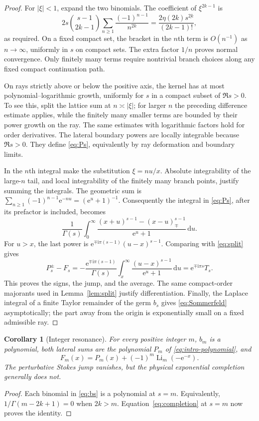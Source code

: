 \documentclass[11pt,a4paper]{article}
\newtheorem{corollary}[theorem]{Corollary}
\theoremstyle{definition}\newtheorem{definition}[theorem]{Definition}
\theoremstyle{remark}\newtheorem{remark}[theorem]{Remark}
\newcommand{\Li}{\operatorname{Li}}
\newcommand{\dd}{\,\mathrm d}
\newcommand{\ii}{\mathrm i}
\newcommand{\ee}{\mathrm e}
\numberwithin{equation}{section}
\begin{document}
\begin{proof}
For $|\xi|<1$, expand the two binomials. The coefficient of $\xi^{2k-1}$
is
\[
 2s\binom{s-1}{2k-1}\sum_{n\ge1}\frac{(-1)^{n-1}}{n^{2k}}
 =\frac{2\eta(2k)s^{\underline{2k}}}{(2k-1)!},
\]
as required. On a fixed compact set, the bracket in the $n$th term is
$O(n^{-1})$ as $n\to\infty$, uniformly in $s$ on compact sets. The extra
factor $1/n$ proves normal convergence. Only finitely many terms require
nontrivial branch choices along any fixed compact continuation path.

On rays strictly above or below the positive axis, the kernel has at most
polynomial--logarithmic growth, uniformly for $s$ in a compact subset of
$\Re s>0$. To see this, split the lattice sum at $n\asymp|\xi|$;
for larger $n$ the preceding difference estimate applies, while the finitely
many smaller terms are bounded by their power growth on the ray. The
same estimates with logarithmic factors hold for order derivatives.
The lateral boundary powers are locally integrable because $\Re s>0$.
They define \eqref{eq:Ps}, equivalently by ray deformation and boundary
limits.

In the $n$th integral make the substitution $\xi=nu/x$. Absolute
integrability of the large-$n$ tail, and local integrability of the finitely
many branch points, justify summing the integrals. The geometric sum is
$\sum_{n\ge1}(-1)^{n-1}\ee^{-nu}=(\ee^u+1)^{-1}$. Consequently the integral
in \eqref{eq:Ps}, after its prefactor is included, becomes
\[
 \frac1{\Gamma(s)}\int_0^\infty
 \frac{(x+u)^{s-1}-(x-u)_{\mp}^{s-1}}{\ee^u+1}\dd u.
\]
For $u>x$, the last power is
$\ee^{\mp\ii\pi(s-1)}(u-x)^{s-1}$. Comparing with \eqref{eq:split} gives
\[
 P_s^\pm-F_s
 =-\frac{\ee^{\mp\ii\pi(s-1)}}{\Gamma(s)}
       \int_x^\infty\frac{(u-x)^{s-1}}{\ee^u+1}\dd u
 =\ee^{\mp\ii\pi s}T_s.
\]
This proves the signs, the jump, and the average. The same compact-order
majorants used in Lemma~\ref{lem:split} justify differentiation.
Finally, the Laplace integral of a finite Taylor remainder of the germ
$b_s$ gives \eqref{eq:Sommerfeld} asymptotically; the part away from the
origin is exponentially small on a fixed admissible ray.
\end{proof}

\begin{corollary}[Integer resonance]\label{cor:integer}
For every positive integer $m$, $b_m$ is a polynomial, both lateral sums
are the polynomial $P_m$ of \eqref{eq:intro-polynomial}, and
\begin{equation}\label{eq:integer-exact}
 F_m(x)=P_m(x)+(-1)^m\Li_m(-\ee^{-x}).
\end{equation}
The perturbative Stokes jump vanishes, but the physical exponential
completion generally does not.
\end{corollary}
\begin{proof}
Each binomial in \eqref{eq:bs} is a polynomial at $s=m$.
Equivalently, $1/\Gamma(m-2k+1)=0$ when $2k>m$.
Equation~\eqref{eq:completion} at $s=m$ now proves the identity.
\end{proof}
\end{document}

